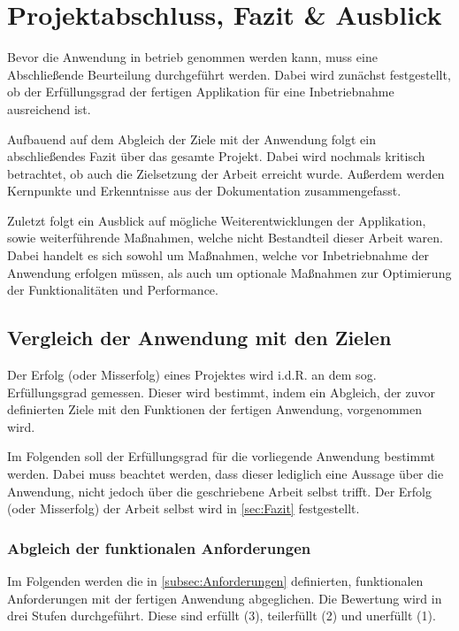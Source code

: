 
\chapter{Projektabschluss, Fazit \& Ausblick}\label{cha:Schlussbetrachtung}
Bevor die Anwendung in betrieb genommen werden kann, muss eine Abschließende Beurteilung durchgeführt werden. Dabei wird zunächst festgestellt, ob der Erfüllungsgrad der fertigen Applikation für eine Inbetriebnahme ausreichend ist.

Aufbauend auf dem Abgleich der Ziele mit der Anwendung folgt ein abschließendes Fazit über das gesamte Projekt. Dabei wird nochmals kritisch betrachtet, ob auch die Zielsetzung der Arbeit erreicht wurde. Außerdem werden Kernpunkte und Erkenntnisse aus der Dokumentation zusammengefasst.

Zuletzt folgt ein Ausblick auf mögliche Weiterentwicklungen der Applikation, sowie weiterführende Maßnahmen, welche nicht Bestandteil dieser Arbeit waren. Dabei handelt es sich sowohl um Maßnahmen, welche vor Inbetriebnahme der Anwendung erfolgen müssen, als auch um optionale Maßnahmen zur Optimierung der Funktionalitäten und Performance. 


\section{Vergleich der Anwendung mit den Zielen}
Der Erfolg (oder Misserfolg) eines Projektes wird i.d.R. an dem sog. Erfüllungsgrad gemessen. Dieser wird bestimmt, indem ein Abgleich, der zuvor definierten Ziele mit den Funktionen der fertigen Anwendung, vorgenommen wird.

Im Folgenden soll der Erfüllungsgrad für die vorliegende Anwendung bestimmt werden. Dabei muss beachtet werden, dass dieser lediglich eine Aussage über die Anwendung, nicht jedoch über die geschriebene Arbeit selbst trifft. Der Erfolg (oder Misserfolg) der Arbeit selbst wird in \autoref{sec:Fazit} festgestellt.

\subsection{Abgleich der funktionalen Anforderungen}
Im Folgenden werden die in \autoref{subsec:Anforderungen} definierten, funktionalen Anforderungen mit der fertigen Anwendung abgeglichen. Die Bewertung wird in drei Stufen durchgeführt. Diese sind erfüllt (3), teilerfüllt (2) und unerfüllt (1).

